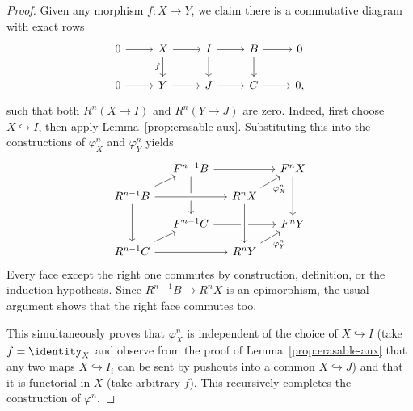 \begin{proof}
	Given any morphism $f:X\to Y$, we claim there is a commutative diagram
	with exact rows
	\begin{equation}\label{eqn:erasable-univ-delta}\begin{tikzcd}
		0 \arrow[r] & X \arrow[d, "f"'] \arrow[r] & I \arrow[r] \arrow[d] & B \arrow[d] \arrow[r] & 0 \\
		0 \arrow[r] & Y \arrow[r] & J \arrow[r] & C \arrow[r] & 0 ,
	\end{tikzcd}\end{equation}
	such that both $R^n(X\to I)$ and $R^n(Y\to J)$ are zero. Indeed, first
	choose $X\hookrightarrow I$, then apply Lemma~\ref{prop:erasable-aux}.
	Substituting this into the constructions of $\varphi_X^n$ and
	$\varphi_Y^n$ yields
	\[\begin{tikzcd}[row sep=small, column sep=small]
		& F^{n-1} B \arrow[rr] \arrow[dd] & & F^n X \arrow[dd] \\
		R^{n-1} B \arrow[ru] \arrow[rr, crossing over] \arrow[dd] & & R^n X \arrow[ru, "{\varphi_X^n}"'] & \\
		& F^{n-1} C \arrow[rr] & & F^n Y \\
		R^{n-1} C \arrow[ru] \arrow[rr] & & R^n Y \arrow[ru, "{\varphi_Y^n}"'] \arrow[leftarrow, uu, crossing over] &
	\end{tikzcd}\]
	Every face except the right one commutes by construction, definition, or
	the induction hypothesis. Since $R^{n-1}B\to R^nX$ is an epimorphism, the
	usual argument shows that the right face commutes too.

	This simultaneously proves that $\varphi_X^n$ is independent of the choice
	of $X\hookrightarrow I$ (take $f=\identity_X$ and observe from the proof of
	Lemma~\ref{prop:erasable-aux} that any two maps $X\hookrightarrow I_i$ can
	be sent by pushouts into a common $X\hookrightarrow J$) and that it is
	functorial in $X$ (take arbitrary $f$). This recursively completes the
	construction of $\varphi^n$.


\end{proof}
